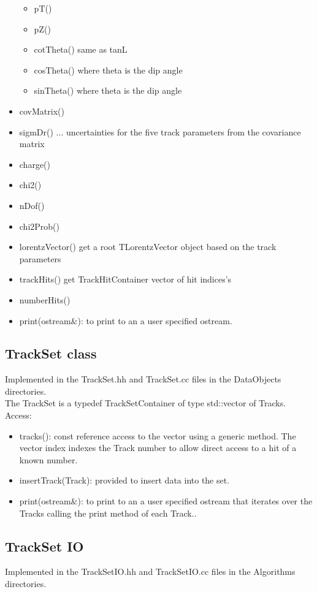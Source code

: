 \documentclass[aps,prd,superscriptaddress,floatfix]{revtex4}
\begin{document}
\begin{itemize}
\begin{itemize}
\item pT()
\item pZ()
\item cotTheta() same as tanL
\item cosTheta() where theta is the dip angle
\item sinTheta() where theta is the dip angle 
\end{itemize}
\item covMatrix()
\item sigmDr() ... uncertainties for the five track parameters from the covariance matrix
\item charge()
\item chi2()
\item nDof()
\item chi2Prob()
\item lorentzVector() get a root TLorentzVector object based on the track parameters
\item trackHits() get TrackHitContainer vector of hit indices's
\item numberHits()
\item print(ostream\&): to print to an a user specified ostream.

\end{itemize}


\subsection{TrackSet class}
Implemented in the TrackSet.hh and TrackSet.cc files in the DataObjects directories.
\\

The TrackSet is a typedef TrackSetContainer of type std::vector of Tracks.
\\

Access:
\begin{itemize}
\item tracks(): const reference access to the vector using a generic method.
The vector index indexes the Track number to allow direct access to a hit of a known number.

\item insertTrack(Track): provided to insert data into the set.


\item print(ostream\&): to print to an a user specified ostream that iterates over
the Tracks calling the print method of each Track..
\end{itemize}


\subsection{TrackSet IO}
Implemented in the TrackSetIO.hh and TrackSetIO.cc files in the Algorithms directories.
\\
\end{document}
